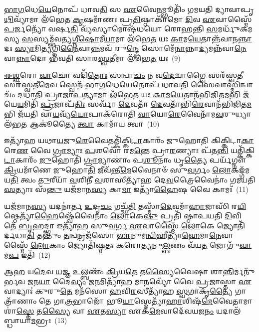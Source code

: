\-\ul{𑌭𑌾}\-\-\ul{𑌗}\-𑌧𑍇\-\ul{𑌯𑍇}\-𑌨𑍋𑌪᳴ 𑌧𑌾𑌵\-\ul{𑌤𑌿} 𑌸 \ul{𑌏}\-𑌵𑍈\-\ul{𑌨}\-𑌮𑍍𑌭𑍂𑌤𑌿𑌂᳴ 𑌗𑌮𑌯𑌤𑌿 𑌦𑍍𑌯𑌾𑌵𑌾𑌪𑍃\-\ul{𑌥𑌿}\-𑌵𑍍𑌯𑌾᳴𑌮𑌾 𑌲᳴𑌭𑍇𑌤 \ul{𑌕𑍃}\-𑌷𑌮𑌾᳴𑌣𑌃 𑌪𑍍𑌰\-\ul{𑌤𑌿}\-𑌷𑍍𑌠𑌾𑌕𑌾᳴𑌮𑍋 \ul{𑌦𑌿}\-𑌵 \ul{𑌏}\-𑌵𑌾𑌸𑍍𑌮𑍈᳴ \ul{𑌪}\-𑌰𑍍𑌜𑌨𑍍𑌯𑍋᳴ 𑌵𑌰𑍍\mbox{}𑌷\-\ul{𑌤𑌿} 𑌵𑍍𑌯᳴𑌸𑍍𑌯𑌾𑌮𑍋𑌷᳴𑌧𑌯𑍋 𑌰𑍋𑌹𑌨𑍍𑌤𑌿 \ul{𑌸}\-𑌮𑌰𑍍𑌧𑍁᳴𑌕𑌮𑌸𑍍𑌯 \ul{𑌸}\-𑌸𑍍𑌯𑌮𑍍𑌭᳴𑌵𑌤𑍍𑌯𑌗𑍍𑌨𑍀\-\ul{𑌷𑍋}\-𑌮𑍀\-\ul{𑌯𑌾}\-𑌮𑌾 𑌲᳴𑌭𑍇\-\ul{𑌤} 𑌯𑌃 \ul{𑌕𑌾}\-𑌮\-\ul{𑌯𑍇}\-𑌤𑌾𑌨𑍍𑌨᳴𑌵𑌾𑌨\-\ul{𑌨𑍍𑌨𑌾}\-𑌦𑌃 \ul{𑌸𑍍𑌯𑌾}\-𑌮𑌿\-\ul{𑌤𑍍𑌯}\-𑌗𑍍𑌨𑌿\-\ul{𑌨𑍈}\-𑌵𑌾\-\ul{𑌨𑍍𑌨}\-𑌮𑌵᳴ 𑌰𑍁\-\ul{𑌨𑍍𑌦𑍍𑌧𑍇} 𑌸𑍋𑌮𑍇᳴\-\ul{𑌨𑌾}\-𑌨𑍍𑌨𑌾\-\ul{𑌦𑍍𑌯}\-𑌮𑌨𑍍𑌨᳴𑌵𑌾\-\ul{𑌨𑍇}\-𑌵𑌾\-\ul{𑌨𑍍𑌨𑌾}\-𑌦𑍋 𑌭᳴𑌵𑌤𑌿 𑌸𑌾𑌰\-\ul{𑌸𑍍𑌵}\-𑌤𑍀𑌮𑌾 𑌲᳴𑌭𑍇\-\ul{𑌤} 𑌯𑌃~(9)

\-\ul{𑌈}\-\-\ul{𑌶𑍍𑌵}\-𑌰𑍋 \ul{𑌵𑌾}\-𑌚𑍋 𑌵𑌦𑌿᳴\-\ul{𑌤𑍋𑌃} 𑌸𑌨𑍍𑌵𑌾\-\ul{𑌚𑌂} 𑌨 𑌵\-\ul{𑌦𑍇}\-𑌦𑍍𑌵𑌾𑌗𑍍𑌵𑍈 𑌸𑌰᳴𑌸𑍍𑌵\-\ul{𑌤𑍀} 𑌸𑌰᳴𑌸𑍍𑌵𑌤𑍀\-\ul{𑌮𑍇}\-𑌵 𑌸𑍍𑌵𑍇𑌨᳴ 𑌭𑌾\-\ul{𑌗}\-𑌧𑍇\-\ul{𑌯𑍇}\-𑌨𑍋𑌪᳴ 𑌧𑌾𑌵\-\ul{𑌤𑌿} 𑌸𑍈𑌵𑌾\-\ul{𑌸𑍍𑌮𑌿}\-𑌨𑍍𑌵𑌾𑌚𑌂᳴ 𑌦𑌧𑌾𑌤𑌿 𑌪𑍍𑌰𑌾𑌜𑌾\-\ul{𑌪}\-𑌤𑍍𑌯𑌾𑌮𑌾 𑌲᳴𑌭𑍇\-\ul{𑌤} 𑌯𑌃 \ul{𑌕𑌾}\-𑌮\-\ul{𑌯𑍇}\-𑌤𑌾𑌨᳴𑌭𑌿𑌜𑌿𑌤\-\ul{𑌮}\-𑌭𑌿 𑌜᳴𑌯𑍇\-\ul{𑌯}\-𑌮𑌿𑌤𑌿᳴ \ul{𑌪𑍍𑌰}\-𑌜𑌾𑌪᳴\-\ul{𑌤𑌿𑌃} 𑌸𑌰𑍍𑌵𑌾᳴ \ul{𑌦𑍇}\-𑌵𑌤𑌾᳴ \ul{𑌦𑍇}\-𑌵𑌤𑌾᳴𑌭𑌿\-\ul{𑌰𑍇}\-𑌵𑌾𑌨᳴𑌭𑌿\-𑌜𑌿𑌤\-\ul{𑌮}\-𑌭𑌿 𑌜᳴𑌯𑌤𑌿 𑌵𑌾\-\ul{𑌯}\-𑌵𑍍𑌯᳴\-\ul{𑌯𑍋}\-𑌪𑌾𑌕᳴𑌰𑍋𑌤𑌿 \ul{𑌵𑌾}\-𑌯𑍋\-\ul{𑌰𑍇}\-𑌵𑍈𑌨𑌾᳴𑌮\-\ul{𑌵}\-𑌰𑍁𑌧𑍍𑌯𑌾 𑌲᳴𑌭\-\ul{𑌤} 𑌆𑌕𑍂॑𑌤𑍍𑌯𑍈 \ul{𑌤𑍍𑌵𑌾} 𑌕𑌾𑌮𑌾᳴𑌯 𑌤𑍍𑌵𑌾~(10)

𑌇𑌤𑍍𑌯𑌾᳴𑌹 𑌯𑌥𑌾\-\ul{𑌯}\-𑌜𑍁\-\ul{𑌰𑍇}\-𑌵𑍈𑌤𑌤𑍍𑌕𑌿᳴𑌕𑍍𑌕𑌿\-\ul{𑌟𑌾}\-𑌕𑌾𑌰𑌂᳴ 𑌜𑍁𑌹𑍋𑌤𑌿 𑌕𑌿𑌕𑍍𑌕𑌿𑌟𑌾\-\ul{𑌕𑌾}\-𑌰𑍇\-\ul{𑌣} 𑌵𑍈 \ul{𑌗𑍍𑌰𑌾}\-𑌮𑍍𑌯𑌾𑌃 \ul{𑌪}\-𑌶𑌵𑍋᳴ 𑌰𑌮\-\ul{𑌨𑍍𑌤𑍇} 𑌪𑍍𑌰𑌾\-\ul{𑌰}\-𑌣𑍍𑌯𑌾𑌃 𑌪᳴𑌤\-\ul{𑌨𑍍𑌤𑌿} 𑌯𑌤𑍍𑌕𑌿᳴𑌕𑍍𑌕𑌿\-\ul{𑌟𑌾}\-𑌕𑌾𑌰𑌂᳴ \ul{𑌜𑍁}\-𑌹𑍋𑌤𑌿᳴ \ul{𑌗𑍍𑌰𑌾}\-𑌮𑍍𑌯𑌾𑌣𑌾𑌂॑ 𑌪\-\ul{𑌶𑍂}\-𑌨𑌾𑌂 𑌧𑍃\-\ul{𑌤𑍍𑌯𑍈} 𑌪𑌰𑍍𑌯᳴𑌗𑍍𑌨𑍗 \ul{𑌕𑍍𑌰𑌿}\-𑌯𑌮𑌾᳴𑌣𑍇 𑌜𑍁𑌹𑍋\-\ul{𑌤𑌿} 𑌜𑍀𑌵᳴𑌨𑍍𑌤𑍀\-\ul{𑌮𑍇}\-𑌵𑍈𑌨𑌾𑍞᳴ 𑌸𑍁\-\ul{𑌵}\-𑌰𑍍𑌗𑌂 \ul{𑌲𑍋}\-𑌕𑌙𑍍𑌗᳴𑌮𑌯\-\ul{𑌤𑌿} 𑌤𑍍𑌵𑌂 \ul{𑌤𑍁}\-𑌰𑍀𑌯𑌾᳴ \ul{𑌵}\-𑌶𑌿𑌨𑍀᳴ \ul{𑌵}\-𑌶𑌾𑌸𑍀𑌤𑍍𑌯𑌾᳴𑌹 𑌦𑍇\-\ul{𑌵}\-𑌤𑍍𑌰𑍈𑌵𑍈𑌨𑌾𑌂॑ 𑌗𑌮𑌯𑌤𑌿 \ul{𑌸}\-𑌤𑍍𑌯𑌾𑌃 𑌸᳴\-\ul{𑌨𑍍𑌤𑍁} 𑌯𑌜᳴𑌮𑌾𑌨\-\ul{𑌸𑍍𑌯} 𑌕𑌾\-\ul{𑌮𑌾} 𑌇𑌤𑍍𑌯𑌾᳴\-\ul{𑌹𑍈}\-𑌷 𑌵𑍈 𑌕𑌾𑌮𑌃᳴~(11)

𑌯𑌜᳴𑌮𑌾𑌨\-\ul{𑌸𑍍𑌯} 𑌯𑌦𑌨𑌾॑𑌰𑍍𑌤 \ul{𑌉}\-𑌦𑍃\-\ul{𑌚𑌂} 𑌗𑌚𑍍𑌛᳴\-\ul{𑌤𑌿} 𑌤𑌸𑍍𑌮𑌾᳴\-\ul{𑌦𑍇}\-𑌵𑌮𑌾᳴\-\ul{𑌹𑌾}\-𑌜𑌾𑌸𑌿᳴ 𑌰\-\ul{𑌯𑌿}\-𑌷𑍍𑌠𑍇𑌤𑍍𑌯𑌾᳴\-\ul{𑌹𑍈}\-𑌷𑍍𑌵𑍇᳴𑌵𑍈𑌨𑌾𑌂॑ \ul{𑌲𑍋}\-𑌕𑍇\-\ul{𑌷𑍁} 𑌪𑍍𑌰𑌤𑌿᳴ 𑌷𑍍𑌠𑌾𑌪𑌯𑌤𑌿 \ul{𑌦𑌿}\-𑌵𑌿 𑌤𑍇᳴ \ul{𑌬𑍃}\-𑌹𑌦𑍍𑌭𑌾 𑌇𑌤𑍍𑌯𑌾᳴𑌹 𑌸𑍁\-\ul{𑌵}\-𑌰𑍍𑌗 \ul{𑌏}\-𑌵𑌾𑌸𑍍𑌮𑍈᳴ \ul{𑌲𑍋}\-𑌕𑍇 𑌜𑍍𑌯𑍋𑌤𑌿᳴𑌰𑍍𑌦𑌧𑌾\-\ul{𑌤𑌿} 𑌤𑌨𑍍𑌤𑍁𑌂᳴ \ul{𑌤}\-𑌨𑍍𑌵𑌨𑍍𑌰𑌜᳴𑌸𑍋 \ul{𑌭𑌾}\-𑌨𑍁𑌮\-\ul{𑌨𑍍𑌵𑌿}\-𑌹𑍀𑌤𑍍𑌯𑌾᳴\-\ul{𑌹𑍇}\-𑌮𑌾\-\ul{𑌨𑍇}\-𑌵𑌾𑌸𑍍𑌮𑍈᳴ \ul{𑌲𑍋}\-𑌕𑌾𑌂 𑌜𑍍𑌯𑍋𑌤𑌿᳴𑌷𑍍𑌮𑌤𑌃 𑌕𑌰𑍋𑌤𑍍𑌯𑌨𑍁\-\ul{𑌲𑍍𑌬}\-𑌣𑌂 𑌵᳴𑌯\-\ul{𑌤} 𑌜𑍋𑌗𑍁᳴\-\ul{𑌵𑌾}\-𑌮\-\ul{𑌪} 𑌇𑌤𑌿᳴~(12)

\-\ul{𑌆}\-\-\ul{𑌹} 𑌯\-\ul{𑌦𑍇}\-𑌵 \ul{𑌯}\-𑌜𑍍𑌞 \ul{𑌉}\-𑌲𑍍𑌬𑌣𑌂᳴ \ul{𑌕𑍍𑌰𑌿}\-𑌯\-\ul{𑌤𑍇} 𑌤\-\ul{𑌸𑍍𑌯𑍈}\-𑌵𑍈𑌷𑌾 𑌶𑌾\-\ul{𑌨𑍍𑌤𑌿}\-𑌰𑍍𑌮𑌨𑍁᳴𑌰𑍍𑌭𑌵 \ul{𑌜}\-𑌨\-\ul{𑌯𑌾} 𑌦𑍈\-\ul{𑌵𑍍𑌯𑌂} 𑌜\-\ul{𑌨}\-𑌮𑌿𑌤𑍍𑌯𑌾᳴𑌹 𑌮𑌾\-\ul{𑌨}\-𑌵𑍍𑌯𑍋᳴ 𑌵𑍈 \ul{𑌪𑍍𑌰}\-𑌜𑌾𑌸𑍍𑌤𑌾 \ul{𑌏}\-𑌵𑌾𑌦𑍍𑌯𑌾𑌃॑ 𑌕𑍁𑌰𑍁\-\ul{𑌤𑍇} 𑌮𑌨᳴𑌸𑍋 \ul{𑌹}\-𑌵𑌿\-\ul{𑌰}\-𑌸𑍀𑌤𑍍𑌯𑌾᳴𑌹 \ul{𑌸𑍍𑌵}\-𑌗𑌾𑌕𑍃᳴\-\ul{𑌤𑍍𑌯𑍈} 𑌗𑌾𑌤𑍍𑌰𑌾᳴𑌣𑌾𑌂 𑌤𑍇 𑌗𑌾\-\ul{𑌤𑍍𑌰}\-𑌭𑌾𑌜𑍋᳴ 𑌭𑍂\-\ul{𑌯𑌾}\-𑌸𑍍𑌮𑍇𑌤𑍍𑌯𑌾᳴\-\ul{𑌹𑌾}\-𑌶𑌿𑌷᳴\-\ul{𑌮𑍇}\-𑌵𑍈𑌤𑌾𑌮𑌾 𑌶𑌾॑\-\ul{𑌸𑍍𑌤𑍇} 𑌤\-\ul{𑌸𑍍𑌯𑍈} 𑌵𑌾 \ul{𑌏}\-𑌤\-\ul{𑌸𑍍𑌯𑌾} 𑌏𑌕᳴\-\ul{𑌮𑍇}\-𑌵𑌾𑌦𑍇᳴𑌵𑌯𑌜\-\ul{𑌨𑌂} 𑌯𑌦𑌾𑌲᳴𑌬𑍍𑌧𑌾𑌯𑌾\-\ul{𑌮}\-𑌭𑍍𑌰𑌃~(13)

